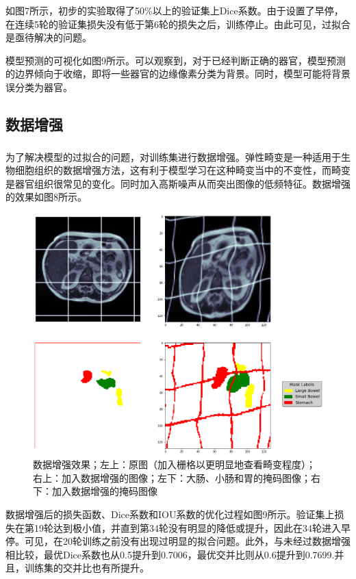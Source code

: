 \documentclass[letterpaper, 10pt, conference, twoside]{ieeeconf}
\newcommand{\upcite}[1]{\textsuperscript{\textsuperscript{\cite{#1}}}}
\begin{document}
如图7所示，初步的实验取得了50\%以上的验证集上Dice系数。由于设置了早停，在连续5轮的验证集损失没有低于第6轮的损失之后，训练停止。由此可见，过拟合是亟待解决的问题。

模型预测的可视化如图9所示。可以观察到，对于已经判断正确的器官，模型预测的边界倾向于收缩，即将一些器官的边缘像素分类为背景。同时，模型可能将背景误分类为器官。

\subsection{数据增强}

为了解决模型的过拟合的问题，对训练集进行数据增强。弹性畸变\upcite{c5}是一种适用于生物细胞组织的数据增强方法，这有利于模型学习在这种畸变当中的不变性，而畸变是器官组织很常见的变化。同时加入高斯噪声从而突出图像的低频特征。数据增强的效果如图8所示。

\begin{figure}[htbp]
  \centering
  \includegraphics[width = 1\linewidth]{elastic3.png}
  \caption{数据增强效果；左上：原图（加入栅格以更明显地查看畸变程度）；右上：加入数据增强的图像；左下：大肠、小肠和胃的掩码图像；右下：加入数据增强的掩码图像}
  \label{fig:fig8}
\end{figure}

数据增强后的损失函数、Dice系数和IOU系数的优化过程如图9所示。验证集上损失在第19轮达到极小值，并直到第34轮没有明显的降低或提升，因此在34轮进入早停。可见，在20轮训练之前没有出现过明显的拟合问题。此外，与未经过数据增强相比较，最优Dice系数也从0.5提升到0.7006，最优交并比则从0.6提升到0.7699.并且，训练集的交并比也有所提升。
\end{document}
